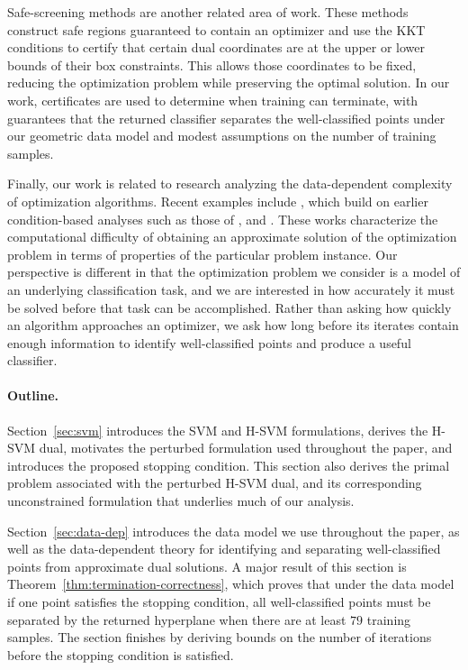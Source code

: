 \documentclass[twoside,11pt]{article}
\begin{document}
Safe-screening methods \citep{Ogawa2013,Zimmert2015} are another related area of work. These methods construct safe regions guaranteed to contain an optimizer and use the KKT conditions to certify that certain dual coordinates are at the upper or lower bounds of their box constraints. This allows those coordinates to be fixed, reducing the optimization problem while preserving the optimal solution. In our work, certificates are used to determine when training can terminate, with guarantees that the returned classifier separates the well-classified points under our geometric data model and modest assumptions on the number of training samples.

Finally, our work is related to research analyzing the data-dependent complexity of optimization algorithms. Recent examples include \citep{Dadush2023, Applegate2023, Lu2023, Lu2023infimal, Xiong2024}, which build on earlier condition-based analyses such as those of \cite{FreundVera1999}, and \cite{CuckerPena2002}. These works characterize the computational difficulty of obtaining an approximate solution of the optimization problem in terms of properties of the particular problem instance. Our perspective is different in that the optimization problem we consider is a model of an underlying classification task, and we are interested in how accurately it must be solved before that task can be accomplished. Rather than asking how quickly an algorithm approaches an optimizer, we ask how long before its iterates contain enough information to identify well-classified points and produce a useful classifier.

\paragraph{Outline.}
Section~\ref{sec:svm} introduces the SVM and H-SVM formulations, derives the H-SVM dual, motivates the perturbed formulation used throughout the paper, and introduces the proposed stopping condition. This section also derives the primal problem associated with the perturbed H-SVM dual, and its corresponding unconstrained formulation that underlies much of our analysis.

Section~\ref{sec:data-dep} introduces the data model we use throughout the paper, as well as the data-dependent theory for identifying and separating well-classified points from approximate dual solutions. A major result of this section is Theorem~\ref{thm:termination-correctness}, which proves that under the data model if one point satisfies the stopping condition, all well-classified points must be separated by the returned hyperplane when there are at least $79$ training samples. The section finishes by deriving bounds on the number of iterations before the stopping condition is satisfied.
\end{document}
